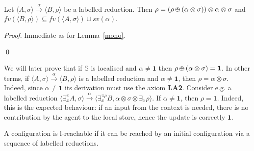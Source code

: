 \documentclass{llncs}
\newcommand{\comment}[1]{}
\def\monid{{\mathbf 0}}
\def\odiv{\, {\ominus\hspace{-7.7pt} \div} \,}
\def\monid{\mathbf{1}}
\begin{document}
\begin{lemma}
\label{l-mono}
Let $\langle A, \sigma \rangle \xrightarrow{\alpha} \langle B, \rho \rangle$ be a labelled reduction. 
Then 
$\rho = (\rho \odiv (\alpha \otimes \sigma)) \otimes \alpha \otimes \sigma$ and 
$fv(\langle B, \rho \rangle) \subseteq fv(\langle A, \sigma \rangle) \cup sv(\alpha)$.
\end{lemma}

\begin {proof}
Immediate as for Lemma~\ref{mono}.
\comment{
The first part is immediate as for Lemma~\ref{mono}.
%
For the latter part, note that $\alpha \neq 1$ means that the proof of the reduction 
uses only the axiom {\bf LA2}, and the property holds because 
$\mathbb S$ is localised and $\rho = \alpha \otimes \sigma$.
%
Let us check that the property 
holds for {\bf LR2}. Inductively, we know that 
$(\sigma_1 \odiv (\alpha \otimes \pi_0 \otimes \sigma)) = \monid$, and
$(\alpha \otimes \sigma \otimes \exists_x ( \sigma_1 \odiv (\alpha \otimes \pi_0  \otimes \sigma))) \odiv (\alpha \otimes \sigma) = \monid$
immediately follows.
}
\qed
\end{proof}

\begin{remark}
We will later prove that if $\mathbb S$ is localised and $\alpha \neq \monid$ then 
$\rho \odiv (\alpha \otimes \sigma) = \monid$.
In other terms, if $\langle A, \sigma \rangle \xrightarrow{\alpha} \langle B, \rho \rangle$ 
is a labelled reduction and $\alpha \neq \monid$, then $\rho = \alpha \otimes \sigma$.
Indeed, since $\alpha \neq \monid$ its derivation must use the axiom  {\bf LA2}.
%
Consider e.g. a labelled reduction 
$ \langle \exists^\pi_x A, \sigma \rangle \xrightarrow{\alpha}
  \langle \exists^{\pi \rho}_x B, \alpha \otimes \sigma \otimes \exists_x \rho \rangle$.
  If $\alpha \neq \monid$, then $\rho = \monid$. 
  Indeed, this is the expected behaviour: if an input from the context is needed,
  there is no contribution by the agent to the local store, hence the update is 
  correctly $\monid$.
\end{remark}

\begin{definition}
A configuration is l-reachable if it can be
reached by an initial configuration via a sequence of 
labelled reductions.
\end{definition}
\end{document}
